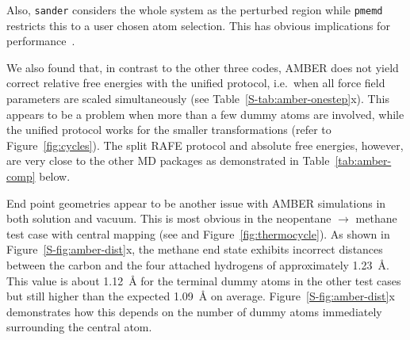 \documentclass[journal=jctcce,manuscript=article]{achemso}
\newcommand{\progname}[1]{\texttt{#1}}
\begin{document}
Also, \progname{sander} considers the whole system as the perturbed
region while \progname{pmemd} restricts this to a user chosen atom selection.  
This has obvious implications for performance~\cite{doi:10.1021/ct400340s}.

We also found that, in contrast to the other three codes, AMBER does not yield
correct relative free energies with the unified protocol, i.e.\
when all force field parameters are scaled simultaneously (see 
Table~\ref{S-tab:amber-onestep}x).  This appears to be a problem when more than 
a few dummy atoms are involved, while the unified protocol works for the 
smaller transformations (refer to Figure~\ref{fig:cycles}).  The split RAFE 
protocol and absolute free energies, however, are very close to the other MD 
packages as demonstrated in Table~\ref{tab:amber-comp} below.

End point geometries appear to be another issue with AMBER simulations
in both solution and vacuum.  This is most obvious in the neopentane 
$\rightarrow$ methane test case with central mapping (see 
 and Figure~\ref{fig:thermocycle}).
As shown in Figure~\ref{S-fig:amber-dist}x, the methane end state exhibits 
incorrect distances between the carbon and the four 
attached hydrogens of approximately \SI{1.23}{\angstrom}.  This value is about 
\SI{1.12}{\angstrom} for the terminal dummy atoms in the other test cases but 
still higher than the expected \SI{1.09}{\angstrom} on average.  
Figure~\ref{S-fig:amber-dist}x demonstrates how this depends on the number of 
dummy atoms immediately surrounding the central atom.
\end{document}
